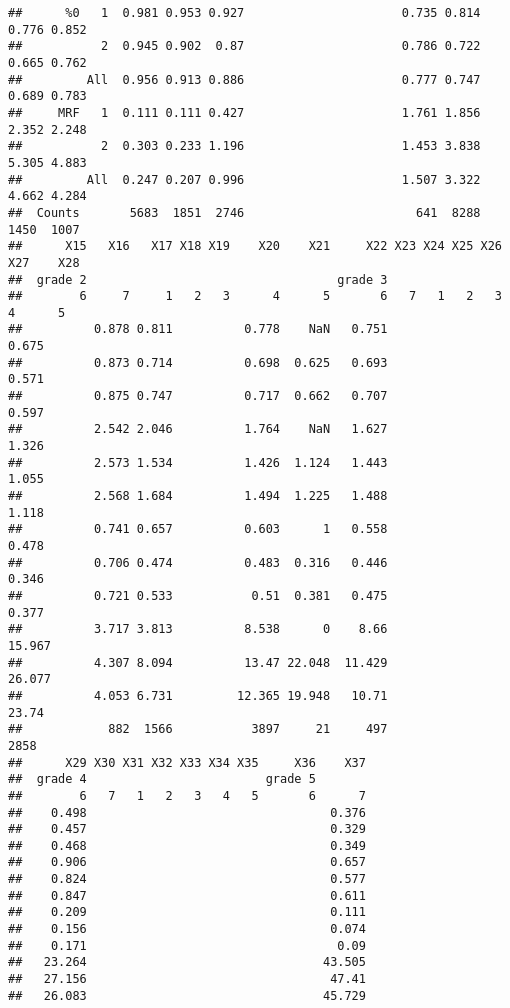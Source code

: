 \documentclass[
]{article}
\begin{document}
\begin{verbatim}
##      %0   1  0.981 0.953 0.927                      0.735 0.814 0.776 0.852
##           2  0.945 0.902  0.87                      0.786 0.722 0.665 0.762
##         All  0.956 0.913 0.886                      0.777 0.747 0.689 0.783
##     MRF   1  0.111 0.111 0.427                      1.761 1.856 2.352 2.248
##           2  0.303 0.233 1.196                      1.453 3.838 5.305 4.883
##         All  0.247 0.207 0.996                      1.507 3.322 4.662 4.284
##  Counts       5683  1851  2746                        641  8288  1450  1007
##      X15   X16   X17 X18 X19    X20    X21     X22 X23 X24 X25 X26 X27    X28
##  grade 2                                   grade 3                           
##        6     7     1   2   3      4      5       6   7   1   2   3   4      5
##          0.878 0.811          0.778    NaN   0.751                      0.675
##          0.873 0.714          0.698  0.625   0.693                      0.571
##          0.875 0.747          0.717  0.662   0.707                      0.597
##          2.542 2.046          1.764    NaN   1.627                      1.326
##          2.573 1.534          1.426  1.124   1.443                      1.055
##          2.568 1.684          1.494  1.225   1.488                      1.118
##          0.741 0.657          0.603      1   0.558                      0.478
##          0.706 0.474          0.483  0.316   0.446                      0.346
##          0.721 0.533           0.51  0.381   0.475                      0.377
##          3.717 3.813          8.538      0    8.66                     15.967
##          4.307 8.094          13.47 22.048  11.429                     26.077
##          4.053 6.731         12.365 19.948   10.71                      23.74
##            882  1566           3897     21     497                       2858
##      X29 X30 X31 X32 X33 X34 X35     X36    X37
##  grade 4                         grade 5       
##        6   7   1   2   3   4   5       6      7
##    0.498                                  0.376
##    0.457                                  0.329
##    0.468                                  0.349
##    0.906                                  0.657
##    0.824                                  0.577
##    0.847                                  0.611
##    0.209                                  0.111
##    0.156                                  0.074
##    0.171                                   0.09
##   23.264                                 43.505
##   27.156                                  47.41
##   26.083                                 45.729

\end{verbatim}
\end{document}
